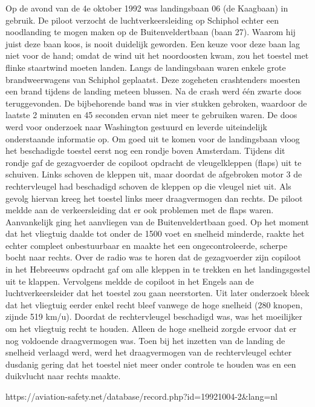 Op de avond van de 4e oktober 1992 was landingsbaan 06 (de Kaagbaan) in gebruik. De piloot verzocht de luchtverkeersleiding op Schiphol echter een noodlanding te mogen maken op de Buitenveldertbaan (baan 27). Waarom hij juist deze baan koos, is nooit duidelijk geworden. Een keuze voor deze baan lag niet voor de hand; omdat de wind uit het noordoosten kwam, zou het toestel met flinke staartwind moeten landen. Langs de landingsbaan waren enkele grote brandweerwagens van Schiphol geplaatst. Deze zogeheten crashtenders moesten een brand tijdens de landing meteen blussen. Na de crash werd één zwarte doos teruggevonden. De bijbehorende band was in vier stukken gebroken, waardoor de laatste 2 minuten en 45 seconden ervan niet meer te gebruiken waren. De doos werd voor onderzoek naar Washington gestuurd en leverde uiteindelijk onderstaande informatie op.
Om goed uit te komen voor de landingsbaan vloog het beschadigde toestel eerst nog een rondje boven Amsterdam. Tijdens dit rondje gaf de gezagvoerder de copiloot opdracht de vleugelkleppen (flaps) uit te schuiven. Links schoven de kleppen uit, maar doordat de afgebroken motor 3 de rechtervleugel had beschadigd schoven de kleppen op die vleugel niet uit. Als gevolg hiervan kreeg het toestel links meer draagvermogen dan rechts. De piloot meldde aan de verkeersleiding dat er ook problemen met de flaps waren.
Aanvankelijk ging het aanvliegen van de Buitenveldertbaan goed. Op het moment dat het vliegtuig daalde tot onder de 1500 voet en snelheid minderde, raakte het echter compleet onbestuurbaar en maakte het een ongecontroleerde, scherpe bocht naar rechts. Over de radio was te horen dat de gezagvoerder zijn copiloot in het Hebreeuws opdracht gaf om alle kleppen in te trekken en het landingsgestel uit te klappen. Vervolgens meldde de copiloot in het Engels aan de luchtverkeersleider dat het toestel zou gaan neerstorten. Uit later onderzoek bleek dat het vliegtuig eerder enkel recht bleef vanwege de hoge snelheid (280 knopen, zijnde 519 km/u). Doordat de rechtervleugel beschadigd was, was het moeilijker om het vliegtuig recht te houden. Alleen de hoge snelheid zorgde ervoor dat er nog voldoende draagvermogen was. Toen bij het inzetten van de landing de snelheid verlaagd werd, werd het draagvermogen van de rechtervleugel echter dusdanig gering dat het toestel niet meer onder controle te houden was en een duikvlucht naar rechts maakte.

https://aviation-safety.net/database/record.php?id=19921004-2&lang=nl 


